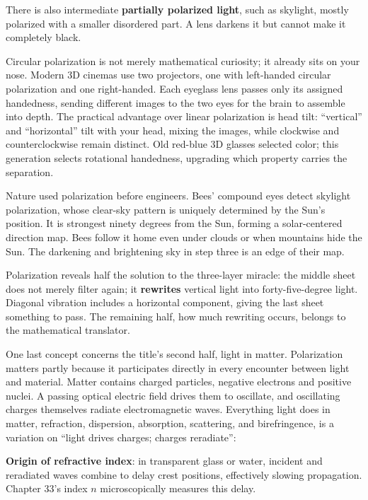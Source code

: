 There is also intermediate \textbf{partially polarized light}, such as skylight, mostly polarized with a smaller disordered part. A lens darkens it but cannot make it completely black.

Circular polarization is not merely mathematical curiosity; it already sits on your nose. Modern 3D cinemas use two projectors, one with left-handed circular polarization and one right-handed. Each eyeglass lens passes only its assigned handedness, sending different images to the two eyes for the brain to assemble into depth. The practical advantage over linear polarization is head tilt: ``vertical'' and ``horizontal'' tilt with your head, mixing the images, while clockwise and counterclockwise remain distinct. Old red-blue 3D glasses selected color; this generation selects rotational handedness, upgrading which property carries the separation.

Nature used polarization before engineers. Bees' compound eyes detect skylight polarization, whose clear-sky pattern is uniquely determined by the Sun's position. It is strongest ninety degrees from the Sun, forming a solar-centered direction map. Bees follow it home even under clouds or when mountains hide the Sun. The darkening and brightening sky in step three is an edge of their map.

Polarization reveals half the solution to the three-layer miracle: the middle sheet does not merely filter again; it \textbf{rewrites} vertical light into forty-five-degree light. Diagonal vibration includes a horizontal component, giving the last sheet something to pass. The remaining half, how much rewriting occurs, belongs to the mathematical translator.

One last concept concerns the title's second half, light in matter. Polarization matters partly because it participates directly in every encounter between light and material. Matter contains charged particles, negative electrons and positive nuclei. A passing optical electric field drives them to oscillate, and oscillating charges themselves radiate electromagnetic waves. Everything light does in matter, refraction, dispersion, absorption, scattering, and birefringence, is a variation on ``light drives charges; charges reradiate'':

\textbf{Origin of refractive index}: in transparent glass or water, incident and reradiated waves combine to delay crest positions, effectively slowing propagation. Chapter 33's index \(n\) microscopically measures this delay.

